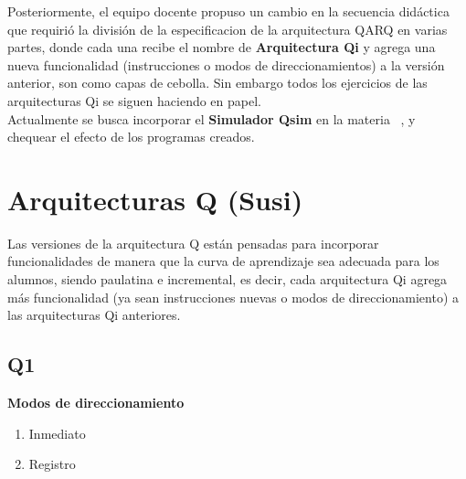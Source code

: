  {Posteriormente, el equipo docente propuso un cambio en la secuencia didáctica que requirió la división de } la especificacion de la arquitectura QARQ en varias partes, donde cada una recibe el nombre de \textbf{Arquitectura Qi} y agrega una nueva funcionalidad (instrucciones o modos de direccionamientos) a la versión anterior, son como capas de cebolla. Sin embargo todos los ejercicios de las arquitecturas Qi se siguen haciendo en papel. \\

Actualmente se busca incorporar el \textbf{Simulador Qsim} en la materia   \ciclo\ , y chequear el efecto de los programas creados.

\section{Arquitecturas Q (Susi)}

Las versiones de la arquitectura Q están pensadas para incorporar funcionalidades de manera que la curva de aprendizaje sea adecuada para los alumnos, siendo paulatina e incremental, es decir, cada arquitectura Qi agrega más funcionalidad (ya sean instrucciones nuevas o modos de direccionamiento) a las arquitecturas Qi anteriores.


\subsection{Q1}


\textbf{Modos de direccionamiento}
\begin{enumerate}
\item Inmediato
\item Registro
\end{enumerate}

